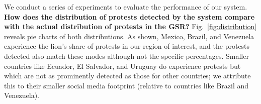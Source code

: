 We conduct a series of experiments to evaluate the performance of our system.\\

\noindent
{\bf How does the distribution of protests detected by the system compare with the
actual distribution of protests in the GSR?}
Fig.~\ref{fig:distribution} reveals pie charts of both distributions. As shown, Mexico, Brazil, and Venezuela
experience the lion's share of protests in our region of interest, and the protests detected also match these modes
although not the specific percentages. Smaller countries like Ecuador, El Salvador, and Uruguay do experience
protests but which are not as prominently detected as those for other countries; we attribute this to their smaller
social media footprint (relative to countries like Brazil and Venezuela).\\

